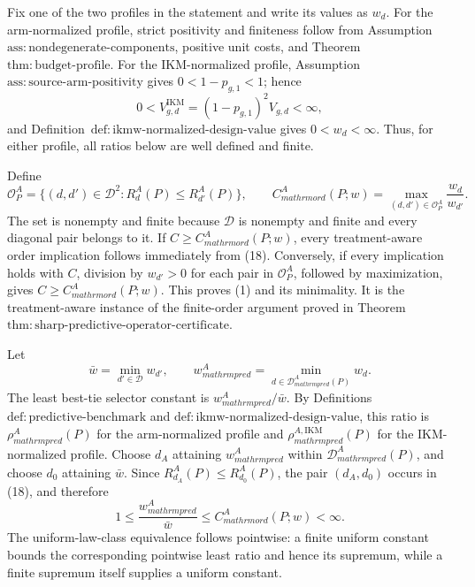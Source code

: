 Fix one of the two profiles in the statement and write its values as \(w_d\).  For the arm-normalized profile, strict positivity and finiteness follow from Assumption~\(\mathrm{ass{:}nondegenerate\text{-}components}\), positive unit costs, and Theorem~\(\mathrm{thm{:}budget\text{-}profile}\).  For the IKM-normalized profile, Assumption~\(\mathrm{ass{:}source\text{-}arm\text{-}positivity}\) gives \(0<1-p_{g,1}<1\); hence
\[
  0<V_{g,d}^{\mathrm{IKM}}
   =(1-p_{g,1})^2V_{g,d}<\infty,
\]
and Definition~\(\mathrm{def{:}ikmw\text{-}normalized\text{-}design\text{-}value}\) gives \(0<w_d<\infty\).  Thus, for either profile, all ratios below are well defined and finite.

Define
\[
  \mathcal O_P^A
  =\{(d,d')\in\mathcal D^2:R_d^A(P)\le R_{d'}^A(P)\},
  \qquad
  C_{mathrm{ord}}^A(P;w)
  =\max_{(d,d')\in\mathcal O_P^A}\frac{w_d}{w_{d'}}.       \tag{18}
\]
The set is nonempty and finite because \(\mathcal D\) is nonempty and finite and every diagonal pair belongs to it.  If \(C\ge C_{mathrm{ord}}^A(P;w)\), every treatment-aware order implication follows immediately from (18).  Conversely, if every implication holds with \(C\), division by \(w_{d'}>0\) for each pair in \(\mathcal O_P^A\), followed by maximization, gives \(C\ge C_{mathrm{ord}}^A(P;w)\).  This proves (1) and its minimality.  It is the treatment-aware instance of the finite-order argument proved in Theorem~\(\mathrm{thm{:}sharp\text{-}predictive\text{-}operator\text{-}certificate}\).

Let
\[
  \bar w=\min_{d'\in\mathcal D}w_{d'},
  \qquad
  w_{mathrm{pred}}^A
  =\min_{d\in\mathcal D_{mathrm{pred}}^A(P)}w_d.
\]
The least best-tie selector constant is \(w_{mathrm{pred}}^A/\bar w\).  By Definitions~\(\mathrm{def{:}predictive\text{-}benchmark}\) and \(\mathrm{def{:}ikmw\text{-}normalized\text{-}design\text{-}value}\), this ratio is \(\rho_{mathrm{pred}}^A(P)\) for the arm-normalized profile and \(\rho_{mathrm{pred}}^{A,\mathrm{IKM}}(P)\) for the IKM-normalized profile.  Choose \(d_A\) attaining \(w_{mathrm{pred}}^A\) within \(\mathcal D_{mathrm{pred}}^A(P)\), and choose \(d_0\) attaining \(\bar w\).  Since \(R_{d_A}^A(P)\le R_{d_0}^A(P)\), the pair \((d_A,d_0)\) occurs in (18), and therefore
\[
  1\le\frac{w_{mathrm{pred}}^A}{\bar w}
  \le C_{mathrm{ord}}^A(P;w)<\infty.                       \tag{19}
\]
The uniform-law-class equivalence follows pointwise: a finite uniform constant bounds the corresponding pointwise least ratio and hence its supremum, while a finite supremum itself supplies a uniform constant.

